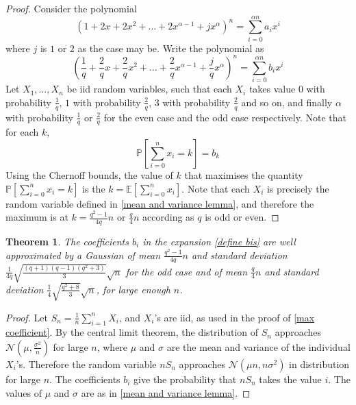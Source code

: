 \documentclass[a4paper,12pt]{article}
\newtheorem{theorem}{Theorem}
\begin{document}
\begin{proof}
    Consider the polynomial 
    \begin{equation}\label{define ais}
        (1 + 2x + 2x^2 +\ldots + 2x^{\alpha-1} + jx^\alpha)^n = \sum_{i = 0}^{\alpha n} a_i x^i 
    \end{equation}
    where $j$ is $1$ or $2$ as the case may be. Write the polynomial as 
    \begin{equation}\label{define bis}
        \left(\frac{1}{q} + \frac{2}{q}x + \frac{2}{q}x^2 +\ldots + \frac{2}{q}x^{\alpha-1} + \frac{j}{q}x^\alpha\right)^n = \sum_{i = 0}^{\alpha n} b_i x^i 
    \end{equation}
    Let $X_1, \ldots, X_n$ be iid random variables, such that each $X_i$ takes value $0$ with probability $\frac{1}{q}$, $1$ with probability $\frac{2}{q}$, $3$ with probability $\frac{2}{q}$ and so on, and finally $\alpha$ with probability $\frac{1}{q}$ or $\frac{2}{q}$ for the even case and the odd case respectively. Note that for each $k$,
    \begin{equation}
        \mathbb{P}\left[\sum_{i = 0}^{n}x_i = k\right] = b_k
    \end{equation}
    Using the Chernoff bounds, the value of $k$ that maximises the quantity $\mathbb{P}\left[\sum_{i = 0}^{n}x_i = k\right]$ is the $k = \mathbb{E}\left[\sum_{i = 0}^{n}x_i\right]$. Note that each $X_i$ is precisely the random variable defined in \cref{mean and variance lemma}, and therefore the maximum is at $k = \frac{q^2-1}{4q}n$ or $\frac{q}{4}n$ according as $q$ is odd or even.
\end{proof}

\begin{theorem}
    The coefficients $b_i$ in the expansion \cref{define bis} are well approximated by a Gaussian of mean $\frac{q^2-1}{4q}n$ and standard deviation $\frac{1}{4q}\sqrt{\frac{(q+1)(q-1)(q^2 + 3)}{3}}\sqrt{n}$ for the odd case and of mean $\frac{q}{4}n$ and standard deviation $\frac{1}{4}\sqrt{\frac{q^2 + 8}{3}}\sqrt{n}$, for large enough $n$.
\end{theorem}

\begin{proof}
    Let $S_n = \frac{1}{n}\sum_{i=1}^{n} X_i$, and $X_i$'s are iid, as used in the proof of \cref{max coefficient}. By the central limit theorem, the distribution of $S_n$ approaches $\mathcal{N}(\mu, \frac{\sigma^2}{n})$ for large $n$, where $\mu$ and $\sigma$ are the mean and variance of the individual $X_i$'s. Therefore the random variable $nS_n$ approaches $\mathcal{N}(\mu n, n\sigma^2)$ in distribution for large $n$. The coefficients $b_i$ give the probability that $nS_n$ takes the value $i$. The values of $\mu$ and $\sigma$ are as in \cref{mean and variance lemma}.
\end{proof}
\end{document}
